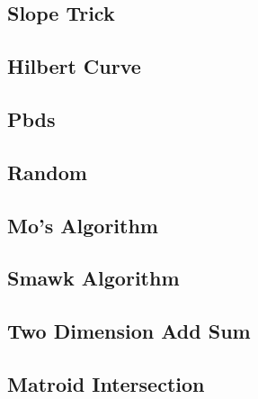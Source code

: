 \subsection{Slope Trick}

\subsection{Hilbert Curve}

\subsection{Pbds}

\subsection{Random}

\subsection{Mo's Algorithm}

\subsection{Smawk Algorithm}

\subsection{Two Dimension Add Sum}

\subsection{Matroid Intersection}
